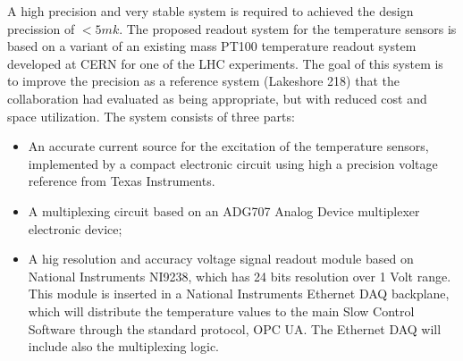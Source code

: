 A high precision and very stable system is required to achieved the design precission of $< 5 mk$.
The proposed readout system for the temperature sensors is based on a variant of an existing mass PT100 temperature readout system developed at CERN for one of the LHC experiments.
The goal of this system is to improve the precision as a reference system (Lakeshore 218) that the collaboration had evaluated as being appropriate,
but with reduced cost and space utilization.
The system consists of three parts:
\begin{itemize}
\item An accurate current source for the excitation of the temperature sensors, implemented by a compact electronic circuit using high a precision voltage reference from Texas Instruments. 
\item A multiplexing circuit based on an ADG707 Analog Device multiplexer electronic device;
\item A hig resolution and accuracy voltage signal readout module based on National Instruments NI9238, which has 24 bits resolution over 1 Volt range.
  This module is inserted in a National Instruments Ethernet DAQ backplane, which will distribute the temperature values to the main Slow Control Software
  through the standard protocol, OPC UA. The Ethernet DAQ will include also the multiplexing logic.
\end{itemize}
